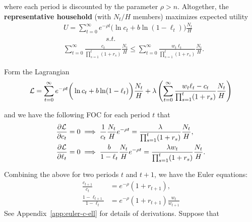 \documentclass[../main.tex]{subfiles}
\begin{document}
        where each period is discounted by the parameter $\rho > n$. Altogether, the \textbf{representative household} (with $N_t/H$ members) maximizes expected utility
        \begin{align}
            & U = \sum_{t=0}^\infty e^{-\rho t}
            \bigg( \ln c_t + b \ln(1-\ell_t) \bigg)
            \frac{N_t}{H}
            \\
            & \qquad\qquad\qquad
            s.t. \nonumber
            \\
            & \sum_{t=0}^{\infty}
            \frac{c_t}{\prod_{s=1}^{t}(1+r_s)} \frac{N_t}{H}
            \le
            \sum_{t=0}^{\infty}
            \frac{w_t \ell_t}{\prod_{s=1}^{t}(1+r_s)} \frac{N_t}{H}.
        \end{align}
        
        Form the Lagrangian
        \begin{align}
            \mathcal{L}
            = \sum_{t=0}^\infty e^{-\rho t}
            \bigg( \ln c_t + b \ln(1-\ell_t) \bigg)
            \frac{N_t}{H} 
            + \lambda \left(
                \sum_{t=0}^{\infty}
                \frac{w_t \ell_t - c_t}{\prod_{s=1}^{t}(1+r_s)}\frac{N_t}{H}
                \right)
        \end{align}
        
        and we have the following FOC for each period $t$ that
        \begin{align}
            \frac{\partial \mathcal{L}}{\partial c_t} = 0
            &\implies
            \frac{1}{c_t}\frac{N_t}{H}e^{-\rho t}
            = \frac{\lambda}{\prod_{s=1}^{t}(1+r_s)} \frac{N_t}{H}, 
            \label{eqn:foc-1}
            \\
            \frac{\partial \mathcal{L}}{\partial \ell_t} = 0
            &\implies
            \frac{b}{1 - \ell_t}\frac{N_t}{H}e^{-\rho t}
            = \frac{\lambda w_t}{\prod_{s=1}^{t}(1+r_s)}\frac{N_t}{H}.
            \label{eqn:foc-2}
        \end{align}
        
        
        Combining the above for two periods $t$ and $t+1$, we have the Euler equations:
        \begin{align}
            \frac{c_{t+1}}{c_t}
            &= e^{-\rho}(1+r_{t+1}),
            \label{eqn:euler-c}
            \\
            \frac{1-\ell_{t+1}}{1-\ell_t}
            &= e^{-\rho}(1+r_{t+1})\frac{w_t}{w_{t+1}}
            \label{eqn:euler-ell}
        \end{align}
        See Appendix~\ref{app:euler-c-ell} for details of derivations. Suppose that
        
\end{document}
